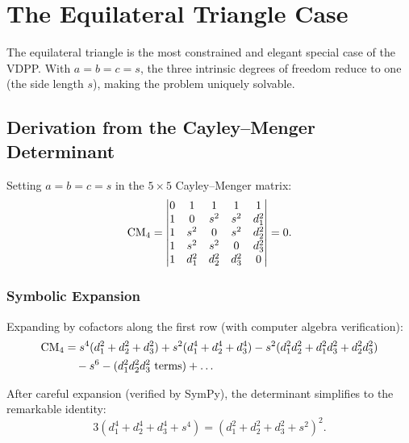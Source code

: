 
\chapter{The Equilateral Triangle Case}
\label{ch:equilateral}

The equilateral triangle is the most constrained and elegant special case of the VDPP. With $a = b = c = s$, the three intrinsic degrees of freedom reduce to one (the side length $s$), making the problem uniquely solvable.

\section{Derivation from the Cayley--Menger Determinant}

Setting $a = b = c = s$ in the $5 \times 5$ Cayley--Menger matrix:
\begin{equation}
\mathrm{CM}_4 = \begin{vmatrix}
0 & 1 & 1 & 1 & 1 \\
1 & 0 & s^2 & s^2 & d_1^2 \\
1 & s^2 & 0 & s^2 & d_2^2 \\
1 & s^2 & s^2 & 0 & d_3^2 \\
1 & d_1^2 & d_2^2 & d_3^2 & 0
\end{vmatrix} = 0.
\end{equation}

\subsection{Symbolic Expansion}

Expanding by cofactors along the first row (with computer algebra verification):
\begin{align}
\mathrm{CM}_4 &= s^4(d_1^2 + d_2^2 + d_3^2) + s^2(d_1^4 + d_2^4 + d_3^4) - s^2(d_1^2 d_2^2 + d_1^2 d_3^2 + d_2^2 d_3^2) \notag \\
&\quad - s^6 - (d_1^2 d_2^2 d_3^2 \text{ terms}) + \ldots
\end{align}

After careful expansion (verified by SymPy), the determinant simplifies to the remarkable identity:
\begin{equation}
\label{eq:equilateral-identity}
\boxed{3(d_1^4 + d_2^4 + d_3^4 + s^4) = (d_1^2 + d_2^2 + d_3^2 + s^2)^2.}
\end{equation}

